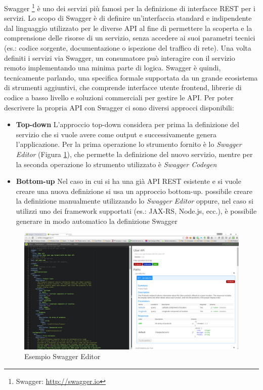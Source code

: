 Swagger \footnote{Swagger: \url{http://swagger.io}} è uno dei servizi più famosi per la definizione di interfacce REST per i servizi.
Lo scopo di Swagger è di definire un'interfaccia standard e indipendente dal linguaggio utilizzato per le diverse API al fine di permettere la scoperta e la comprensione delle risorse di un servizio, senza accedere ai suoi parametri tecnici (es.: codice sorgente, documentazione o ispezione del traffico di rete). Una volta definiti i servizi via Swagger, un consumatore può interagire con il servizio remoto implementando una minima parte di logica.
Swagger è quindi, tecnicamente parlando, una specifica formale supportata da un grande ecosistema di strumenti aggiuntivi, che comprende interfacce utente frontend, librerie di codice a basso livello e soluzioni commerciali per gestire le API.
Per poter descrivere la propria API con Swagger ci sono diversi approcci disponibili:
\begin{itemize}
	\item \textbf{Top-down} L'approccio top-down considera per prima la definizione del servizio che si vuole avere come output e successivamente genera l'applicazione. Per la prima operazione lo strumento fornito è lo \emph{Swagger Editor} (Figura \ref{fig:swagger}), che permette la definizione del nuovo servizio, mentre per la seconda operazione lo strumento utilizzato è \emph{Swagger Codegen}
	\item \textbf{Bottom-up} Nel caso in cui si ha una già API REST esistente e si vuole creare una nuova definizione si usa un approccio bottom-up. \upe possibile creare la definizione manualmente utilizzando lo \emph{Swagger Editor} oppure, nel caso si utilizzi uno dei framework supportati (es.: JAX-RS, Node.js, ecc.), è possibile generare in modo automatico la definizione Swagger
\end{itemize}

\begin{figure}[ht]
	\centering
	\includegraphics[width=\textwidth]{2-nozioni-preliminari/Immagini/swagger.png}
	\caption{Esempio Swagger Editor}\label{fig:swagger}
\end{figure}

